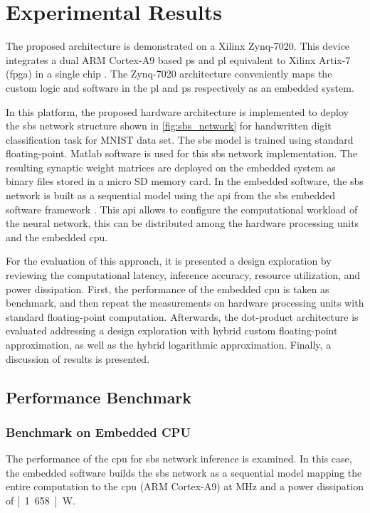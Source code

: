 \section{Experimental Results}
\label{sec:experimental_results}
The proposed architecture is demonstrated on a Xilinx Zynq-7020. This device integrates a dual ARM Cortex-A9 based \gls{ps} and \gls{pl} equivalent to Xilinx Artix-7 (\gls{fpga}) in a single chip \cite{xilinx2015zynq}. The Zynq-7020 architecture conveniently maps the custom logic and software in the \gls{pl} and \gls{ps} respectively as an embedded system.

In this platform, the proposed hardware architecture is implemented to deploy the \gls{sbs} network structure shown in \ref{fig:sbs_network} for handwritten digit classification task for MNIST data set. The \gls{sbs} model is trained using standard floating-point. Matlab software is used for this \gls{sbs} network implementation. The resulting synaptic weight matrices are deployed on the embedded system as binary files stored in a micro SD memory card. In the embedded software, the \gls{sbs} network is built as a sequential model using the \gls{api} from the \gls{sbs} embedded software framework \cite{nevarez2020accelerator}. This \gls{api} allows to configure the computational workload of the neural network, this can be distributed among the hardware processing units and the embedded \gls{cpu}.

For the evaluation of this approach, it is presented a design exploration by reviewing the computational latency, inference accuracy, resource utilization, and power dissipation. First, the performance of the embedded \gls{cpu} is taken as benchmark, and then repeat the measurements on hardware processing units with standard floating-point computation. Afterwards, the dot-product architecture is evaluated addressing a design exploration with hybrid custom floating-point approximation, as well as the hybrid logarithmic approximation. Finally, a discussion of results is presented.


\subsection{Performance Benchmark}
\subsubsection{Benchmark on Embedded CPU}

The performance of the \gls{cpu} for \gls{sbs} network inference is examined. In this case, the embedded software builds the \gls{sbs} network as a sequential model mapping the entire computation to the \gls{cpu} (ARM Cortex-A9) at \unit[666]{MHz} and a power dissipation of \unit[1.658]{W}.

